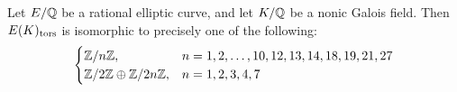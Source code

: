 \begin{frame}[plain]
\begin{thm}[M.]
Let $E/\mathbb{Q}$ be a rational elliptic curve, and let $K/\mathbb{Q}$ be a nonic Galois field. Then $E(K)_\tors$ is isomorphic to precisely one of the following:
	\[
	\begin{cases}
	\mathbb{Z}/n\mathbb{Z}, & n= 1, 2, \ldots, 10, 12, 13, 14, 18, 19, 21, 27 \\
	\mathbb{Z}/2\mathbb{Z} \oplus \mathbb{Z}/2n\mathbb{Z}, & n= 1, 2, 3, 4, 7
	\end{cases}
	\]
\end{thm}
\end{frame}



\begin{frame}[plain]
	\begin{table}[!ht]
	\centering
	\caption{Examples of each possible $E(K)_\tors$ in $\Phi_\Q^{\Gal}(9)$.}
\end{table}
\end{frame}
